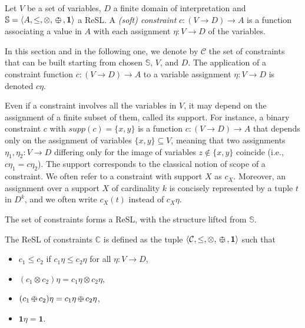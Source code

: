 \documentclass{llncs}
\def\monid{{\mathbf 0}}
\def\monop{\otimes}
\def\odiv{\, {\ominus\hspace{-7.7pt} \div} \,}
\def\monid{\mathbf{1}}
\begin{document}
\begin{definition}\label{def:softconstraints}
	Let $V$ be a set of variables, $D$ a finite domain of interpretation
	and ${\mathbb S} = \langle A, \leq, \monop, \odiv, \monid \rangle$ a ReSL.
	A \emph{(soft) constraint} $c: (V \rightarrow D) \rightarrow
	A$ is a function associating a value in $A$ with each assignment
	$\eta: V\rightarrow D$ of the variables.
\end{definition}

In this section and in the following one, we denote by $\mathcal{C}$ the set of constraints that can be
built starting from chosen $\mathbb S$, $V$, and $D$. The application of a
constraint function $c:(V \rightarrow D) \rightarrow A$ to a variable
assignment $\eta:V\rightarrow D$ is denoted $c\eta$.  

Even if
a constraint involves all the variables in $V$, it may depend on
the assignment of a finite subset of them, called its support. For
instance, a binary constraint $c$ with $supp(c)=\{x,y\}$ is a function
$c: (V\rightarrow D)\rightarrow A$ that depends only on the
assignment of variables $\{x,y\}\subseteq V$, meaning that two
assignments $\eta_1, \eta_2: V \rightarrow D$ differing only for the
image of variables $z \not \in \{x,y\}$ coincide (i.e., $c\eta_1 =
c\eta_2$).
%
The support corresponds to the classical notion of scope of a
constraint.  We often refer to a constraint with support $X$ as $c_X$.
Moreover, an assignment over a support $X$ of cardinality $k$ is concisely
represented by a tuple $t$ in $D^k$, and we often write $c_X(t)$
instead of $c_X\eta$.

\smallskip
The set of constraints forms a ReSL, with the structure
lifted from ${\mathbb S}$.

\begin{lemma}\label{prop:soft}
	The ReSL of constraints $\mathbb C$ is
	defined as the tuple $\langle {\mathcal C}, \leq, \monop, \odiv, \monid \rangle$ such that
	
	\begin{itemize}
		\item $c_1 \leq c_2$ if $c_1\eta\leq c_2\eta$ for all $\eta: V \rightarrow D$,
		\item $(c_1\monop c_2)\eta = c_1\eta\monop c_2\eta$, %
		\item $(c_1\odiv c_2)\eta = c_1\eta\odiv c_2\eta$, %
		\item $\monid \eta = \monid$.
	\end{itemize}
\end{lemma}
\end{document}
